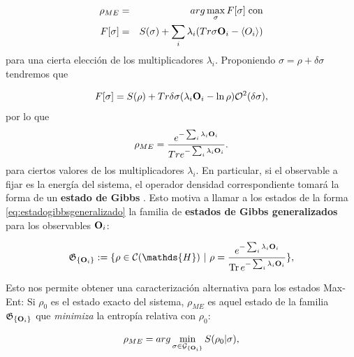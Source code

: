 \documentclass{report} %
\numberwithin{equation}{section}
\begin{document}
\begin{eqnarray}
\rho_{ME} &=& {arg}\max_{\sigma} F[\sigma]\;\mbox{con}\\
F[\sigma]&=&S(\sigma)+\sum_i \lambda_i ({Tr}\sigma{ \bf O}_i-\langle O_i\rangle)
\label{max-ent_def1}
\end{eqnarray}
para una cierta elección de los multiplicadores $\lambda_i$. Proponiendo $\sigma=\rho+\delta \sigma$ tendremos que

\begin{equation*}
F[\sigma]=S(\rho)+
{Tr}\delta \sigma (\lambda_i {\bf O}_i-\ln \rho)
{\cal O}^2(\delta \sigma),
\end{equation*}
\noindent por lo que \begin{equation}
\rho_{ME}=\frac{e^{-\sum_i \lambda_i {\bf O}_i}}{{Tr}e^{-\sum_i \lambda_i {\bf O}_i}}.
\label{eq:estadogibbsgeneralizado}
\end{equation}
para ciertos valores de los multiplicadores $\lambda_i$. En particular, si el observable a fijar es la energía del sistema, el operador densidad correspondiente tomará la forma de un \textbf{estado de Gibbs} \cite{PATHRIA2011115}. Esto motiva a llamar a los estados de la forma \ref{eq:estadogibbsgeneralizado} la familia de \textbf{estados de Gibbs generalizados} para los observables ${\bf O}_i$:

\begin{equation*}
\mathfrak{G}_{\{{\bf O}_i\}}:=\{\rho \in \mathcal{C}(\mathds{H})\textnormal{ | }\rho=\frac{e^{-\sum_i \lambda_i {\bf O}_i}}{\Tr e^{-\sum_i \lambda_i {\bf O}_i}}\},
\label{Gibbs_state}
\end{equation*}

Esto nos permite obtener una caracterización alternativa para los estados Max-Ent: Si $\rho_{0}$ es el estado exacto del sistema, $\rho_{ME}$ es aquel estado de la familia $\mathfrak{G}_{\{{\bf O}_i\}}$ que \emph{minimiza}
la entropía relativa con $\rho_0$:

\begin{equation}
\rho_{ME}= {arg}\min_{\sigma \in {\cal G}_{\{{\bf O}_i\}}}S(\rho_0|\sigma),
\end{equation}
\end{document}

